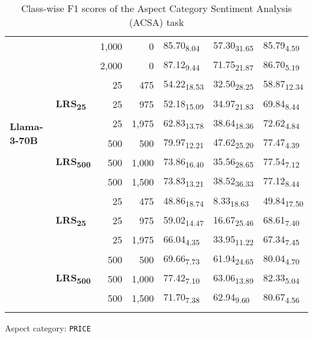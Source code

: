 \begin{table}[H]
\begin{subtable}{\linewidth}
{\begin{tabular}{llrrlll}
 &  & 1,000 & 0 & 85.70\textsubscript{8.04} & 57.30\textsubscript{31.65} & 85.79\textsubscript{4.59} \\
 &  & 2,000 & 0 & 87.12\textsubscript{9.44} & 71.75\textsubscript{21.87} & 86.70\textsubscript{5.19} \\
\hline
\multirow{6}{*}{\textbf{Llama-3-70B}} & \multirow{3}{*}{\textbf{LRS\textsubscript{25}}} & 25 & 475 & 54.22\textsubscript{18.53} & 32.50\textsubscript{28.25} & 58.87\textsubscript{12.34} \\
 &  & 25 & 975 & 52.18\textsubscript{15.09} & 34.97\textsubscript{21.83} & 69.84\textsubscript{8.44} \\
 &  & 25 & 1,975 & 62.83\textsubscript{13.78} & 38.64\textsubscript{18.36} & 72.62\textsubscript{4.84} \\
\arrayrulecolor{gray}\cline{2-7}\arrayrulecolor{black}
 & \multirow{3}{*}{\textbf{LRS\textsubscript{500}}} & 500 & 500 & 79.97\textsubscript{12.21} & 47.62\textsubscript{25.20} & 77.47\textsubscript{4.39} \\
 &  & 500 & 1,000 & 73.86\textsubscript{16.40} & 35.56\textsubscript{28.65} & 77.54\textsubscript{7.12} \\
 &  & 500 & 1,500 & 73.83\textsubscript{13.21} & 38.52\textsubscript{36.33} & 77.12\textsubscript{8.44} \\
\arrayrulecolor{gray}\cline{2-7}\arrayrulecolor{black}
\hline
\multirow{6}{*}{\textbf{GPT-3.5-turbo}} & \multirow{3}{*}{\textbf{LRS\textsubscript{25}}} & 25 & 475 & 48.86\textsubscript{18.74} & 8.33\textsubscript{18.63} & 49.84\textsubscript{17.50} \\
 &  & 25 & 975 & 59.02\textsubscript{14.47} & 16.67\textsubscript{25.46} & 68.61\textsubscript{7.40} \\
 &  & 25 & 1,975 & 66.04\textsubscript{4.35} & 33.95\textsubscript{11.22} & 67.34\textsubscript{7.45} \\
\arrayrulecolor{gray}\cline{2-7}\arrayrulecolor{black}
 & \multirow{3}{*}{\textbf{LRS\textsubscript{500}}} & 500 & 500 & 69.66\textsubscript{7.73} & 61.94\textsubscript{24.65} & 80.04\textsubscript{4.70} \\
 &  & 500 & 1,000 & 77.42\textsubscript{7.10} & 63.06\textsubscript{13.89} & 82.33\textsubscript{5.04} \\
 &  & 500 & 1,500 & 71.70\textsubscript{7.38} & 62.94\textsubscript{9.60} & 80.67\textsubscript{4.56} \\
\arrayrulecolor{gray}\cline{2-7}\arrayrulecolor{black}
\hline
\end{tabular}
}
\caption{Aspect category: \texttt{PRICE}}
\end{subtable}
\caption{Class-wise F1 scores of the Aspect Category Sentiment Analysis (ACSA) task}
\end{table}


